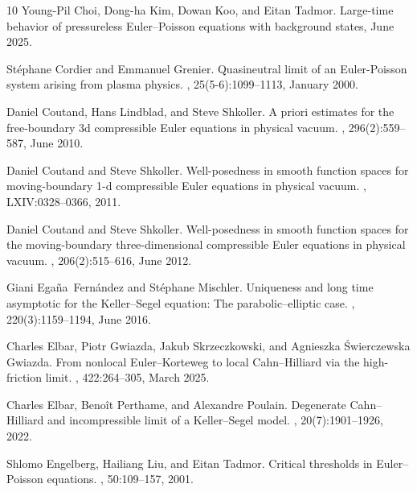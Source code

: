 \documentclass[11pt]{article}
\theoremstyle{plain}
\theoremstyle{definition}
\theoremstyle{remark}
\numberwithin{equation}{section}
\begin{document}
\begin{thebibliography}{10}
Young-Pil Choi, Dong-ha Kim, Dowan Koo, and Eitan Tadmor.
\newblock Large-time behavior of pressureless Euler--Poisson equations with background states, June 2025.

Stéphane Cordier and Emmanuel Grenier.
\newblock Quasineutral limit of an Euler-Poisson system arising from plasma physics.
, 25(5-6):1099--1113, January 2000.

Daniel Coutand, Hans Lindblad, and Steve Shkoller.
\newblock A priori estimates for the free-boundary 3d compressible Euler equations in physical vacuum.
, 296(2):559--587, June 2010.

Daniel Coutand and Steve Shkoller.
\newblock Well-posedness in smooth function spaces for moving-boundary 1-d compressible Euler equations in physical vacuum.
, LXIV:0328--0366, 2011.

Daniel Coutand and Steve Shkoller.
\newblock Well-posedness in smooth function spaces for the moving-boundary three-dimensional compressible Euler equations in physical vacuum.
, 206(2):515--616, June 2012.

Giani Egaña~Fernández and Stéphane Mischler.
\newblock Uniqueness and long time asymptotic for the Keller--Segel equation: The parabolic--elliptic case.
, 220(3):1159--1194, June 2016.

Charles Elbar, Piotr Gwiazda, Jakub Skrzeczkowski, and Agnieszka Świerczewska Gwiazda.
\newblock From nonlocal Euler--Korteweg to local Cahn--Hilliard via the high-friction limit.
, 422:264--305, March 2025.

Charles Elbar, Beno\^{i}t Perthame, and Alexandre Poulain.
\newblock Degenerate Cahn--Hilliard and incompressible limit of a Keller--Segel model.
, 20(7):1901--1926, 2022.

Shlomo Engelberg, Hailiang Liu, and Eitan Tadmor.
\newblock Critical thresholds in Euler--Poisson equations.
, 50:109--157, 2001.


\end{thebibliography}
\end{document}
